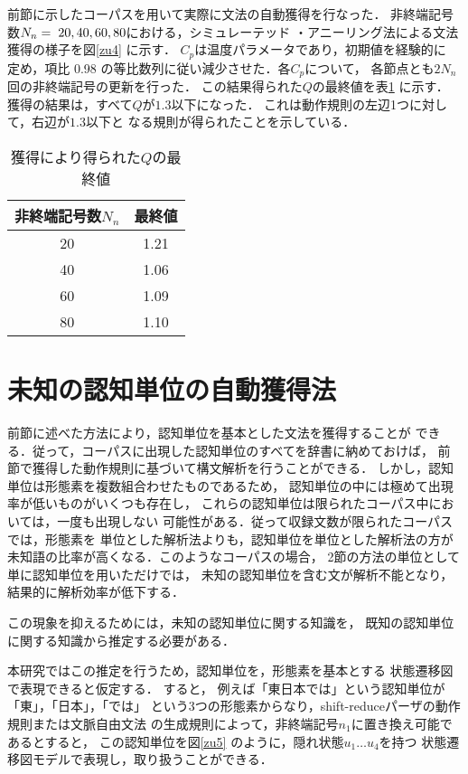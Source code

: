 前節に示したコーパスを用いて実際に文法の自動獲得を行なった．
非終端記号数$N_n = \hspace*{1mm}20, 40, 60, 80$における，シミュレーテッド
・アニーリング法による文法獲得の様子を図\ref{zu4} に示す．
$C_p$は温度パラメータであり，初期値を経験的に
定め，項比 0.98 の等比数列に従い減少させた．\hspace*{-2mm}各$C_p$について，
各節点とも$2N_n$回の非終端記号の更新を行った．
この結果得られた$Q$の最終値を表\ref{hyo1} に示す．
獲得の結果は，すべて$Q$が$1.3$以下になった．
これは動作規則の左辺1つに対して，右辺が$1.3$以下と
なる規則が得られたことを示している．

\vfill

\begin{table}
\caption{獲得により得られた$Q$の最終値} \label{hyo1}
\begin{center}
\begin{tabular}{c|c}
\hline \hline
非終端記号数$N_n$ & 最終値 \\ \hline \hline
20 & 1.21 \\
40 & 1.06 \\
60 & 1.09 \\
80 & 1.10 \\
\hline \hline
\end{tabular}
\end{center}
\end{table}

\section{未知の認知単位の自動獲得法}

前節に述べた方法により，認知単位を基本とした文法を獲得することが
できる．従って，コーパスに出現した認知単位のすべてを辞書に納めておけば，
前節で獲得した動作規則に基づいて構文解析を行うことができる．
しかし，認知単位は形態素を複数組合わせたものであるため，
認知単位の中には極めて出現率が低いものがいくつも存在し，
これらの認知単位は限られたコーパス中においては，一度も出現しない
可能性がある．従って収録文数が限られたコーパスでは，形態素を
単位とした解析法よりも，認知単位を単位とした解析法の方が
未知語の比率が高くなる．このようなコーパスの場合，
2節の方法の単位として単に認知単位を用いただけでは，
未知の認知単位を含む文が解析不能となり，結果的に解析効率が低下する．

この現象を抑えるためには，未知の認知単位に関する知識を，
既知の認知単位に関する知識から推定する必要がある．

本研究ではこの推定を行うため，認知単位を，形態素を基本とする
状態遷移図で表現できると仮定する．
すると，
例えば「東日本では」という認知単位が「東」，「日本」，「では」
という3つの形態素からなり，shift-reduceパーザの動作規則または文脈自由文法
の生成規則によって，非終端記号$n_1$に置き換え可能であるとすると，
この認知単位を図\ref{zu5} のように，隠れ状態$u_1\ldots u_4$を持つ
状態遷移図モデルで表現し，取り扱うことができる．

